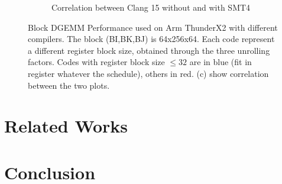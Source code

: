 \documentclass[sigconf,review]{acmart}
\begin{document}
\begin{figure}[ht]
\begin{subfigure}[h]{0.45\textwidth}
  \caption{Correlation between Clang 15 without and with SMT4}
  \end{subfigure}
  \caption{Block DGEMM Performance used on Arm ThunderX2 with different compilers. The block (BI,BK,BJ) is 64x256x64. Each code represent a different register block size, obtained through the three unrolling factors. Codes with register block size $\leq 32$ are in blue (fit in register whatever the schedule), others in red. (c) show correlation between the two plots. \label{fig:cascadelake}}
\end{figure}

\section{Related Works}
\section{Conclusion}
\label{sec:conclusion}


\end{document}
